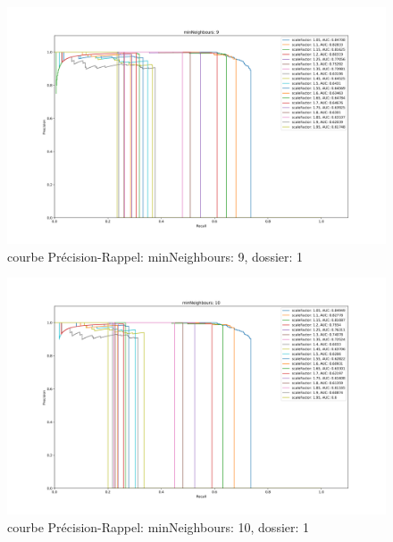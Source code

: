 \documentclass[a4paper,11pt]{article}
\begin{document}
	\begin{figure}[H]
	    \begin{center}
		\includegraphics[scale = 0.4]{images/courbes/folder_01_minN_9.png}
		\caption{courbe Précision-Rappel: minNeighbours: 9, dossier: 1}
		\label{fig:minN_2}
	    \end{center}
	\end{figure}

	\begin{figure}[H]
	    \begin{center}
		\includegraphics[scale = 0.4]{images/courbes/folder_01_minN_10.png}
		\caption{courbe Précision-Rappel: minNeighbours: 10, dossier: 1}
		\label{fig:minN_2}
	    \end{center}
	\end{figure}
\end{document}
